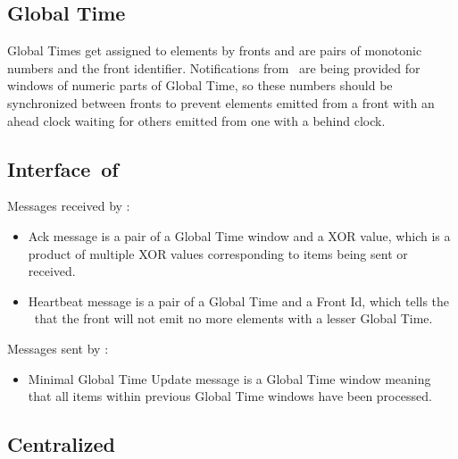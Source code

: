 \label {fs-acker-impl}


\subsection{Global Time}

Global Times get assigned to elements by fronts and are pairs of monotonic numbers and the front identifier. Notifications from \tracker\ are being provided for windows of numeric parts of Global Time, so these numbers should be synchronized between fronts to prevent elements emitted from a front with an ahead clock waiting for others emitted from one with a behind clock.

\subsection{Interface\ of\ \tracker\ }

Messages received by \tracker:
\begin{itemize}
	\item Ack message is a pair of a Global Time window and a XOR value, which is a product of multiple XOR values corresponding to items being sent or received.
	\item Heartbeat message is a pair of a Global Time and a Front Id, which tells the \tracker\ that the front will not emit no more elements with a lesser Global Time.
\end{itemize}
Messages sent by \tracker:
\begin{itemize}
	\item Minimal Global Time Update message is a Global Time window meaning that all items within previous Global Time windows have been processed.
\end{itemize}


\subsection{Centralized \tracker\ }

